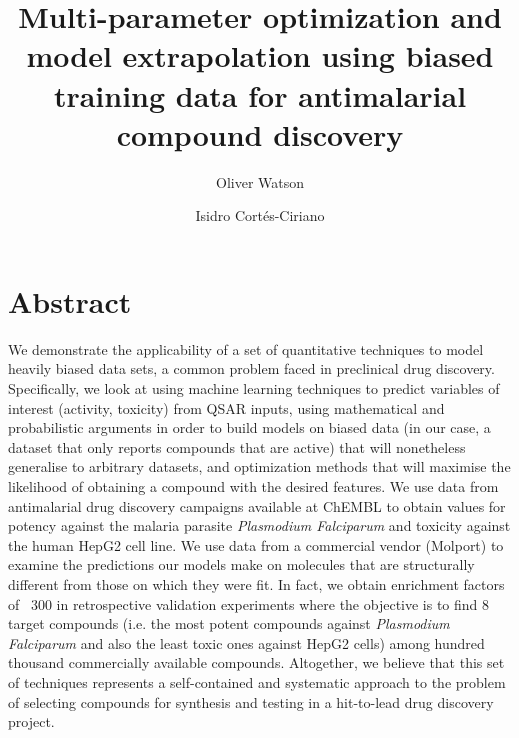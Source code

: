 \documentclass[journal=jacsat,manuscript=article]{achemso}
\author{Oliver Watson}
\affiliation[]{Evariste Technologies Ltd}
\author{Isidro Cortés-Ciriano}
\affiliation[]{Centre for Molecular Informatics, Department of Chemistry, University of Cambridge, Lensfield Road, Cambridge, CB2 1EW, United Kingdom.}
\title{Multi-parameter optimization and model extrapolation using biased training data for antimalarial compound discovery}
\begin{document}

\maketitle

\section*{Abstract}

We demonstrate the applicability of a set of quantitative techniques to model heavily biased data sets, a common problem faced in preclinical drug discovery. %
Specifically, we look at using machine learning techniques to predict variables of interest (activity, toxicity) from QSAR inputs, using mathematical and probabilistic arguments in order to build models on biased data (in our case, a dataset that only reports compounds that are active) that will nonetheless generalise to arbitrary datasets, and optimization methods that will maximise the likelihood of obtaining a compound with the desired features. We use data from 
antimalarial drug discovery campaigns available at ChEMBL %
to obtain values for potency against the malaria parasite \textit{Plasmodium Falciparum} and toxicity against the human HepG2 cell line.  We use data from a commercial vendor (Molport) to examine the predictions our models make on 
molecules that are structurally  different from those on which they were fit. 
In fact, we obtain enrichment factors of ~300 in retrospective validation experiments where the objective is to find 8 target compounds (i.e. the most potent compounds against \textit{Plasmodium Falciparum} and also the least toxic ones against HepG2 cells) among hundred thousand commercially available compounds.
Altogether, we believe that this set of techniques represents a self-contained and systematic approach to the problem of selecting compounds for synthesis and testing in a hit-to-lead drug discovery project.
\newpage
\end{document}
